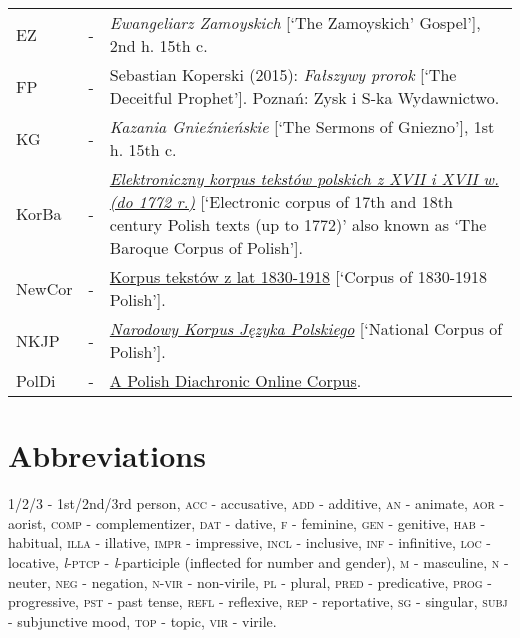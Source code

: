\documentclass[output=paper
,modfonts
,nonflat]{langsci/langscibook}
\newcommand{\glossformat}[1]{\textsc{#1}}
\newcommand{\firstperson}{\glossformat{1}\xspace}
\newcommand{\secondperson}{\glossformat{2}\xspace}
\newcommand{\thirdperson}{\glossformat{3}\xspace}
\newcommand{\acc}{\glossformat{acc}\xspace}
\newcommand{\add}{\glossformat{add}\xspace}
\newcommand{\an}{\glossformat{an}\xspace}
\newcommand{\aor}{\glossformat{aor}\xspace}
\newcommand{\comp}{\glossformat{comp}\xspace}
\newcommand{\dat}{\glossformat{dat}\xspace}
\newcommand{\fem}{\glossformat{f}\xspace}
\newcommand{\gen}{\glossformat{gen}\xspace}
\newcommand{\hab}{\glossformat{hab}\xspace}
\newcommand{\illa}{\glossformat{illa}\xspace}
\newcommand{\impr}{\glossformat{impr}\xspace}
\newcommand{\incl}{\glossformat{incl}\xspace}
\newcommand{\infv}{\glossformat{inf}\xspace}
\newcommand{\loc}{\glossformat{loc}\xspace}
\newcommand{\negation}{\glossformat{neg}\xspace}
\newcommand{\lptcp}{\emph{l}\glossformat{-ptcp}\xspace}
\newcommand{\masc}{\glossformat{m}\xspace}
\newcommand{\n}{\glossformat{n}\xspace}
\newcommand{\nvir}{\glossformat{n-vir}\xspace}
\newcommand{\pred}{\glossformat{pred}\xspace}
\newcommand{\pst}{\glossformat{pst}\xspace}
\newcommand{\pl}{\glossformat{pl}\xspace}
\newcommand{\prog}{\glossformat{prog}\xspace}
\newcommand{\refl}{\glossformat{refl}\xspace}
\newcommand{\rep}{\glossformat{rep}\xspace}
\newcommand{\sg}{\glossformat{sg}\xspace}
\newcommand{\subj}{\glossformat{subj}\xspace}
\newcommand{\topi}{\glossformat{top}\xspace}
\newcommand{\vir}{\glossformat{vir}\xspace}
\begin{document}
\noindent\begin{tabular}{ l c p{10 cm}}
	EZ & - & \emph{Ewangeliarz Zamoyskich} [`The Zamoyskich' Gospel'], 2nd h. 15th c. \\
	FP & - & Sebastian Koperski (2015): \emph{Fałszywy prorok} [`The Deceitful Prophet']. Poznań: Zysk i S-ka Wydawnictwo. \\
	KG & - &  \emph{Kazania Gnieźnieńskie} [`The Sermons of Gniezno'], 1st h. 15th c. \\
	KorBa & - & \href{http://korba.edu.pl/query_corpus/} {\emph{Elektroniczny korpus tekstów polskich z XVII i XVII w. (do 1772 r.)}} [`Electronic corpus of 17th and 18th century Polish texts (up to 1772)' also known as `The Baroque Corpus of Polish']. \\
	NewCor & - & \href{https://szukajwslownikach.uw.edu.pl/f19/} {Korpus tekstów z lat 1830-1918} [`Corpus of 1830-1918 Polish']. \\
  	NKJP & - & \href{http://nkjp.pl/} {\emph{Narodowy Korpus Języka Polskiego}} [`National Corpus of Polish']. \\
	PolDi & - & \href{http://rhssl1.uni-regensburg.de/SlavKo/korpus/poldi} {A Polish Diachronic Online Corpus}. \\
\end{tabular}

\section*{Abbreviations} {\firstperson}/{\secondperson}/{\thirdperson} - 1st/2nd/3rd person, {\acc} - accusative, {\add} - additive, {\an} - animate, {\aor} - aorist, {\comp} - complementizer, {\dat} - dative, {\fem} - feminine, {\gen} - genitive, {\hab} - habitual, {\illa} - illative, {\impr} - impressive, {\incl} - inclusive, {\infv} - infinitive, {\loc} - locative, {\lptcp} - \emph{l}-participle (inflected for number and gender), {\masc} - masculine, {\n} - neuter, {\negation} - negation, {\nvir} - non-virile, {\pl} - plural, {\pred} - predicative, {\prog} - progressive, {\pst} - past tense, {\refl} - reflexive, {\rep} - reportative, {\sg} - singular, {\subj} - subjunctive mood, {\topi} - topic, {\vir} - virile.
\end{document}
